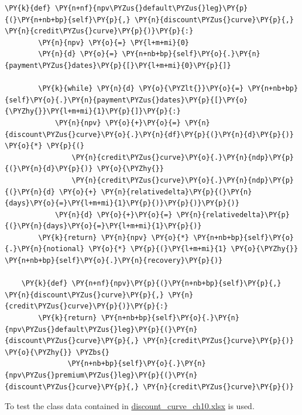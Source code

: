 \begin{codebox}
\begin{Verbatim}[commandchars=\\\{\}]
    \PY{k}{def} \PY{n+nf}{npv\PYZus{}default\PYZus{}leg}\PY{p}{(}\PY{n+nb+bp}{self}\PY{p}{,} \PY{n}{discount\PYZus{}curve}\PY{p}{,} \PY{n}{credit\PYZus{}curve}\PY{p}{)}\PY{p}{:}
        \PY{n}{npv} \PY{o}{=} \PY{l+m+mi}{0}
        \PY{n}{d} \PY{o}{=} \PY{n+nb+bp}{self}\PY{o}{.}\PY{n}{payment\PYZus{}dates}\PY{p}{[}\PY{l+m+mi}{0}\PY{p}{]}
        
        \PY{k}{while} \PY{n}{d} \PY{o}{\PYZlt{}}\PY{o}{=} \PY{n+nb+bp}{self}\PY{o}{.}\PY{n}{payment\PYZus{}dates}\PY{p}{[}\PY{o}{\PYZhy{}}\PY{l+m+mi}{1}\PY{p}{]}\PY{p}{:}
            \PY{n}{npv} \PY{o}{+}\PY{o}{=} \PY{n}{discount\PYZus{}curve}\PY{o}{.}\PY{n}{df}\PY{p}{(}\PY{n}{d}\PY{p}{)} \PY{o}{*} \PY{p}{(}
                \PY{n}{credit\PYZus{}curve}\PY{o}{.}\PY{n}{ndp}\PY{p}{(}\PY{n}{d}\PY{p}{)} \PY{o}{\PYZhy{}}
                \PY{n}{credit\PYZus{}curve}\PY{o}{.}\PY{n}{ndp}\PY{p}{(}\PY{n}{d} \PY{o}{+} \PY{n}{relativedelta}\PY{p}{(}\PY{n}{days}\PY{o}{=}\PY{l+m+mi}{1}\PY{p}{)}\PY{p}{)}\PY{p}{)}
            \PY{n}{d} \PY{o}{+}\PY{o}{=} \PY{n}{relativedelta}\PY{p}{(}\PY{n}{days}\PY{o}{=}\PY{l+m+mi}{1}\PY{p}{)}
        \PY{k}{return} \PY{n}{npv} \PY{o}{*} \PY{n+nb+bp}{self}\PY{o}{.}\PY{n}{notional} \PY{o}{*} \PY{p}{(}\PY{l+m+mi}{1} \PY{o}{\PYZhy{}} \PY{n+nb+bp}{self}\PY{o}{.}\PY{n}{recovery}\PY{p}{)}
    
    \PY{k}{def} \PY{n+nf}{npv}\PY{p}{(}\PY{n+nb+bp}{self}\PY{p}{,} \PY{n}{discount\PYZus{}curve}\PY{p}{,} \PY{n}{credit\PYZus{}curve}\PY{p}{)}\PY{p}{:}
        \PY{k}{return} \PY{n+nb+bp}{self}\PY{o}{.}\PY{n}{npv\PYZus{}default\PYZus{}leg}\PY{p}{(}\PY{n}{discount\PYZus{}curve}\PY{p}{,} \PY{n}{credit\PYZus{}curve}\PY{p}{)} \PY{o}{\PYZhy{}} \PYZbs{}
               \PY{n+nb+bp}{self}\PY{o}{.}\PY{n}{npv\PYZus{}premium\PYZus{}leg}\PY{p}{(}\PY{n}{discount\PYZus{}curve}\PY{p}{,} \PY{n}{credit\PYZus{}curve}\PY{p}{)}
\end{Verbatim}
\end{codebox}    

To test the class data contained in \href{https://drive.google.com/file/d/1mugHyet3H9tcSAvYvt8G4_kpfaEbVY7b/view?usp=sharing}{discount\_curve\_ch10.xlsx} is used.

